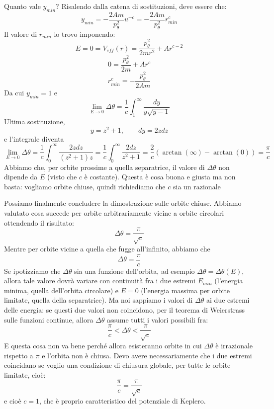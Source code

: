 \documentclass[a4paper,openany]{article}
\begin{document}
	Quanto vale $y_{min}$? Risalendo dalla catena di sostituzioni, deve essere che:
	$$
	y_{min} = -\dfrac{2Am}{p_{\theta}^2}u^{-c} = -\dfrac{2Am}{p_{\theta}^2}r_{min}^{c}
	$$
	Il valore di $r_{min}$ lo trovo imponendo:
	$$
	E = 0 = V_{eff}(r) = \dfrac{p_{\theta}^2}{2mr^2}+Ar^{c-2}
	$$
	$$
	0=\dfrac{p_{\theta}^2}{2m}+Ar^{c}
	$$
	$$
	r^{c}_{min} = -\dfrac{p_{\theta}^2}{2Am}
	$$
	Da cui $y_{min} = 1$ e
	\begin{equation}\label{key}
		\lim_{E\to 0}\Delta\theta = \dfrac{1}{c}\int_{1}^{\infty} \dfrac{dy}{y\sqrt{y-1}} 
	\end{equation}
	Ultima sostituzione, 
	$$
	y = z^2 + 1, \quad \quad dy = 2zdz
	$$
	e l'integrale diventa
	\begin{equation}\label{key}
		\lim_{E\to 0}\Delta\theta = \dfrac{1}{c}\int_{0}^{\infty} \dfrac{2zdz}{(z^2+1)z} = \dfrac{1}{c}\int_{0}^{\infty} \dfrac{2dz}{z^2+1} = \dfrac{2}{c}(\arctan(\infty)-\arctan(0)) = \dfrac{\pi}{c}
	\end{equation}
	Abbiamo che, per orbite prossime a quella separatrice, il valore di $\Delta\theta$ non dipende da $E$ (visto che $c$ è costante). Questa è cosa buona e giusta ma non basta: vogliamo orbite chiuse, quindi richiediamo che $c$ sia un razionale
	
	
	Possiamo finalmente concludere la dimostrazione sulle orbite chiuse. Abbiamo valutato cosa succede per orbite arbitrariamente vicine a orbite circolari ottendendo il risultato:
	\begin{equation}\label{key}
		\Delta\theta = \dfrac{\pi}{\sqrt{c}}
	\end{equation}
	Mentre per orbite vicine a quella che fugge all'infinito, abbiamo che
	\begin{equation}\label{key}
		\Delta\theta = \dfrac{\pi}{c}
	\end{equation}
	Se ipotizziamo che $\Delta\theta$ sia una funzione dell'orbita, ad esempio  $\Delta\theta = \Delta\theta(E)$, allora tale valore dovrà variare con continuità fra i due estremi $E_{min}$ (l'energia minima, quella dell'orbita circolare) e $E=0$ (l'energia massima per orbite limitate, quella della separatrice). Ma noi sappiamo i valori di $\Delta\theta$ ai due estremi delle energia: se questi due valori non coincidono, per il teorema di Weierstrass sulle funzioni continue, allora $\Delta\theta$ assume tutti i valori possibili fra:
	\begin{equation}\label{key}
		\dfrac{\pi}{c} < \Delta\theta < \dfrac{\pi}{\sqrt{c}}
	\end{equation}
	E questa cosa non va bene perché allora esisteranno orbite in cui $\Delta\theta$ è irrazionale rispetto a $\pi$ e l'orbita non è chiusa. Devo avere necessariamente che i due estremi coincidano se voglio una condizione di chiusura globale, per tutte le orbite limitate, cioè:
	\begin{equation}\label{key}
		\dfrac{\pi}{c} = \dfrac{\pi}{\sqrt{c}}
	\end{equation}
	e cioè $c=1$, che è proprio caratteristico del potenziale di Keplero. 
	
\end{document}
